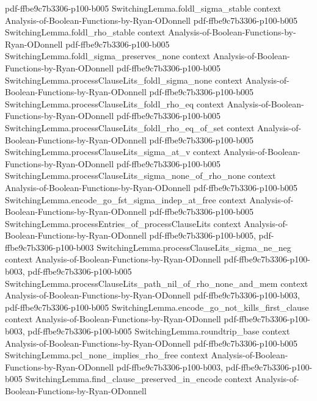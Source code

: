 \begin{lemma}
  {pdf-ffbe9c7b3306-p100-b005}
\proofstep
  {SwitchingLemma.foldl_sigma_stable}
  {context}
  {Analysis-of-Boolean-Functions-by-Ryan-ODonnell}
  {pdf-ffbe9c7b3306-p100-b005}
\proofstep
  {SwitchingLemma.foldl_rho_stable}
  {context}
  {Analysis-of-Boolean-Functions-by-Ryan-ODonnell}
  {pdf-ffbe9c7b3306-p100-b005}
\proofstep
  {SwitchingLemma.foldl_sigma_preserves_none}
  {context}
  {Analysis-of-Boolean-Functions-by-Ryan-ODonnell}
  {pdf-ffbe9c7b3306-p100-b005}
\proofstep
  {SwitchingLemma.processClauseLits_foldl_sigma_none}
  {context}
  {Analysis-of-Boolean-Functions-by-Ryan-ODonnell}
  {pdf-ffbe9c7b3306-p100-b005}
\proofstep
  {SwitchingLemma.processClauseLits_foldl_rho_eq}
  {context}
  {Analysis-of-Boolean-Functions-by-Ryan-ODonnell}
  {pdf-ffbe9c7b3306-p100-b005}
\proofstep
  {SwitchingLemma.processClauseLits_foldl_rho_eq_of_set}
  {context}
  {Analysis-of-Boolean-Functions-by-Ryan-ODonnell}
  {pdf-ffbe9c7b3306-p100-b005}
\proofstep
  {SwitchingLemma.processClauseLits_sigma_at_v}
  {context}
  {Analysis-of-Boolean-Functions-by-Ryan-ODonnell}
  {pdf-ffbe9c7b3306-p100-b005}
\proofstep
  {SwitchingLemma.processClauseLits_sigma_none_of_rho_none}
  {context}
  {Analysis-of-Boolean-Functions-by-Ryan-ODonnell}
  {pdf-ffbe9c7b3306-p100-b005}
\proofstep
  {SwitchingLemma.encode_go_fst_sigma_indep_at_free}
  {context}
  {Analysis-of-Boolean-Functions-by-Ryan-ODonnell}
  {pdf-ffbe9c7b3306-p100-b005}
\proofstep
  {SwitchingLemma.processEntries_of_processClauseLits}
  {context}
  {Analysis-of-Boolean-Functions-by-Ryan-ODonnell}
  {pdf-ffbe9c7b3306-p100-b005,
    pdf-ffbe9c7b3306-p100-b003}
\proofstep
  {SwitchingLemma.processClauseLits_sigma_ne_neg}
  {context}
  {Analysis-of-Boolean-Functions-by-Ryan-ODonnell}
  {pdf-ffbe9c7b3306-p100-b003,
    pdf-ffbe9c7b3306-p100-b005}
\proofstep
  {SwitchingLemma.processClauseLits_path_nil_of_rho_none_and_mem}
  {context}
  {Analysis-of-Boolean-Functions-by-Ryan-ODonnell}
  {pdf-ffbe9c7b3306-p100-b003,
    pdf-ffbe9c7b3306-p100-b005}
\proofstep
  {SwitchingLemma.encode_go_not_kills_first_clause}
  {context}
  {Analysis-of-Boolean-Functions-by-Ryan-ODonnell}
  {pdf-ffbe9c7b3306-p100-b003,
    pdf-ffbe9c7b3306-p100-b005}
\proofstep
  {SwitchingLemma.roundtrip_base}
  {context}
  {Analysis-of-Boolean-Functions-by-Ryan-ODonnell}
  {pdf-ffbe9c7b3306-p100-b005}
\proofstep
  {SwitchingLemma.pcl_none_implies_rho_free}
  {context}
  {Analysis-of-Boolean-Functions-by-Ryan-ODonnell}
  {pdf-ffbe9c7b3306-p100-b003,
    pdf-ffbe9c7b3306-p100-b005}
\proofstep
  {SwitchingLemma.find_clause_preserved_in_encode}
  {context}
  {Analysis-of-Boolean-Functions-by-Ryan-ODonnell}

\end{lemma}
